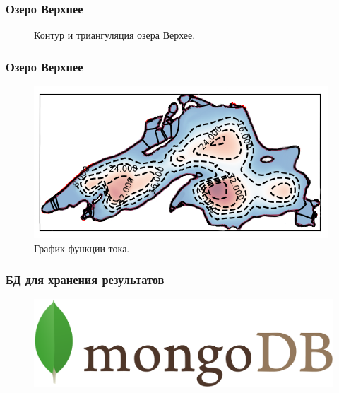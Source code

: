 \documentclass[10pt,utf8,presentation,compress]{beamer}
\begin{document}
\begin{frame}
\frametitle{Озеро Верхнее}
	\begin{figure}[H]
		\centering
		\hfill
		\caption{Контур и триангуляция озера Верхее.}
	\end{figure}
\end{frame}

\begin{frame}
\frametitle{Озеро Верхнее}
	\begin{figure}[H]
		\centering
		\includegraphics[width=0.9\linewidth]{images/ex4/psi/1}
		\caption{График функции тока.}
	\end{figure}
\end{frame}

\begin{frame}
\frametitle{БД для хранения результатов}
	\begin{figure}[H]
		\centering
		\includegraphics[width=0.8\linewidth]{images/slides/logo/mongo}
	\end{figure}
\end{frame}
\end{document}
